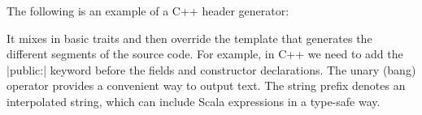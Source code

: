 The following is an example of a C++ header generator:
%
%
It mixes in basic traits and then override the template that generates the different segments of the source code.
For example, in C++ we need to add the \Scala|public:| keyword before the fields and constructor declarations.
The unary \Scala{!} (bang) operator provides a convenient way to output text.
The  string prefix denotes an interpolated string, which can include Scala expressions in a type-safe way.
